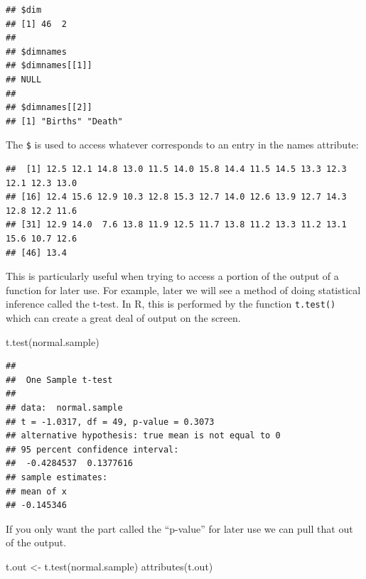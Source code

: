 \documentclass[
]{book}
\newenvironment{Shaded}{\begin{snugshade}}{\end{snugshade}}
\newcommand{\FunctionTok}[1]{\textcolor[rgb]{0.00,0.00,0.00}{#1}}
\newcommand{\NormalTok}[1]{#1}
\newcommand{\OtherTok}[1]{\textcolor[rgb]{0.56,0.35,0.01}{#1}}
\newcommand{\SpecialCharTok}[1]{\textcolor[rgb]{0.00,0.00,0.00}{#1}}
\begin{document}
\begin{verbatim}
## $dim
## [1] 46  2
## 
## $dimnames
## $dimnames[[1]]
## NULL
## 
## $dimnames[[2]]
## [1] "Births" "Death"
\end{verbatim}

The \texttt{\$} is used to access whatever corresponds to an entry in the names attribute:

\begin{Shaded}
\end{Shaded}

\begin{verbatim}
##  [1] 12.5 12.1 14.8 13.0 11.5 14.0 15.8 14.4 11.5 14.5 13.3 12.3 12.1 12.3 13.0
## [16] 12.4 15.6 12.9 10.3 12.8 15.3 12.7 14.0 12.6 13.9 12.7 14.3 12.8 12.2 11.6
## [31] 12.9 14.0  7.6 13.8 11.9 12.5 11.7 13.8 11.2 13.3 11.2 13.1 15.6 10.7 12.6
## [46] 13.4
\end{verbatim}

This is particularly useful when trying to access a portion of the output of a function for later use. For example, later we will see a method of doing statistical inference called the t-test. In R, this is performed by the function \texttt{t.test()} which can create a great deal of output on the screen.

\begin{Shaded}
\begin{Highlighting}[]
\FunctionTok{t.test}\NormalTok{(normal.sample)}
\end{Highlighting}
\end{Shaded}

\begin{verbatim}
## 
##  One Sample t-test
## 
## data:  normal.sample
## t = -1.0317, df = 49, p-value = 0.3073
## alternative hypothesis: true mean is not equal to 0
## 95 percent confidence interval:
##  -0.4284537  0.1377616
## sample estimates:
## mean of x 
## -0.145346
\end{verbatim}

If you only want the part called the ``p-value'' for later use we can pull that out of the output.

\begin{Shaded}
\begin{Highlighting}[]
\NormalTok{t.out }\OtherTok{\textless{}{-}} \FunctionTok{t.test}\NormalTok{(normal.sample)}
\FunctionTok{attributes}\NormalTok{(t.out)}
\end{Highlighting}
\end{Shaded}
\end{document}
